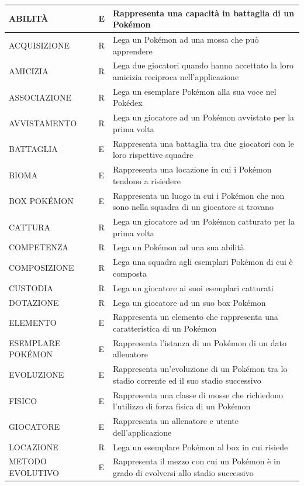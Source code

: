 \documentclass[a4paper,12pt]{report}
\begin{document}
\begin{longtable}{|
>{\raggedright\arraybackslash}m{5cm}|
>{\centering\arraybackslash}m{2cm}|
>{\raggedright\arraybackslash}m{8cm}|}
ABILITÀ & E & Rappresenta una capacità in battaglia di un Pokémon  \\
\hline
ACQUISIZIONE & R & Lega un Pokémon ad una mossa che può apprendere  \\
\hline
AMICIZIA & R & Lega due giocatori quando hanno accettato la loro amicizia reciproca nell'applicazione \\
\hline
ASSOCIAZIONE & R & Lega un esemplare Pokémon alla sua voce nel Pokédex \\
\hline
AVVISTAMENTO & R & Lega un giocatore ad un Pokémon avvistato per la prima volta \\
\hline
BATTAGLIA & E & Rappresenta una battaglia tra due giocatori con le loro rispettive squadre \\
\hline
BIOMA & E & Rappresenta una locazione in cui i Pokémon tendono a risiedere \\
\hline
BOX POKÉMON & E & Rappresenta un luogo in cui i Pokémon che non sono nella squadra di un giocatore si trovano \\
\hline
CATTURA & R & Lega un giocatore ad un Pokémon catturato per la prima volta \\
\hline
COMPETENZA & R & Lega un Pokémon ad una sua abilità \\
\hline
COMPOSIZIONE & R & Lega una squadra agli esemplari Pokémon di cui è composta \\
\hline
CUSTODIA & R & Lega un giocatore ai suoi esemplari catturati \\
\hline
DOTAZIONE & R & Lega un giocatore ad un suo box Pokémon \\
\hline
ELEMENTO & E & Rappresenta un elemento che rappresenta una caratteristica di un Pokémon \\
\hline
ESEMPLARE POKÉMON & E & Rappresenta l'istanza di un Pokémon di un dato allenatore \\
\hline
EVOLUZIONE & E & Rappresenta un'evoluzione di un Pokémon tra lo stadio corrente ed il suo stadio successivo \\
\hline
FISICO & E & Rappresenta una classe di mosse che richiedono l'utilizzo di forza fisica di un Pokémon \\
\hline
GIOCATORE & E & Rappresenta un allenatore e utente dell'applicazione \\
\hline
LOCAZIONE & R & Lega un esemplare Pokémon al box in cui risiede \\
\hline
METODO EVOLUTIVO & E & Rappresenta il mezzo con cui un Pokémon è in grado di evolversi allo stadio successivo \\

\end{longtable}
\end{document}

